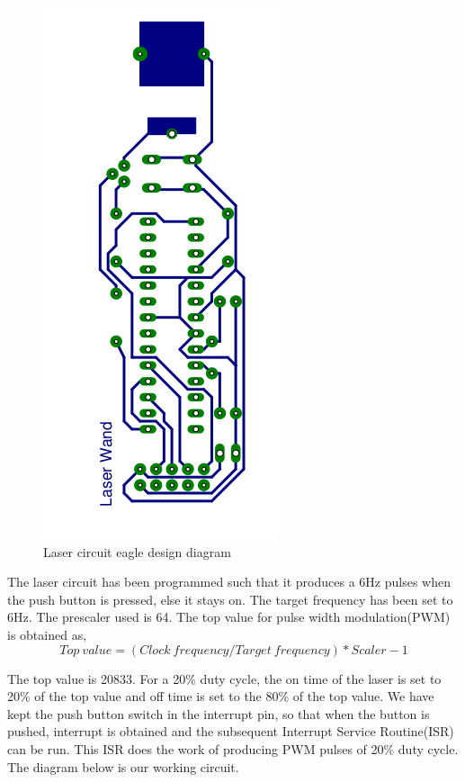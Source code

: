 \documentclass[12pt, a4paper]{article}
\begin{document}
\begin{figure}[htp]
	\centering
	\includegraphics[scale=0.3]{eagle-non-mirror.png}
	\caption{Laser circuit eagle design diagram}
	\label{}
\end{figure}

	The laser circuit has been programmed such that it produces a 6Hz pulses when the push button is pressed, else it stays on. The target frequency has been set to 6Hz. The prescaler used is 64. The top value for pulse width modulation(PWM) is obtained as, 
	\begin{equation}
	Top\ value = (Clock\  frequency/Target\  frequency)*Scaler - 1
	\end{equation}
	
	The top value is 20833. For a 20\% duty cycle, the on time of the laser is set to 20\% of the top value and off time is set to the 80\% of the top value. We have kept the push button switch in the interrupt pin, so that when the button is pushed, interrupt is obtained and the subsequent Interrupt Service Routine(ISR) can be run. This ISR does the work of producing PWM pulses of 20\% duty cycle. The diagram below is our working circuit.
\end{document}
